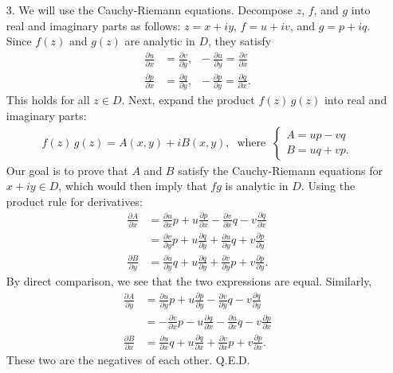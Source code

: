 \documentclass[10pt,a4paper]{article}
\begin{document}
\begin{enumerate}
\item[3.]
We will use the Cauchy-Riemann equations. Decompose $z$, $f$, and
$g$ into real and imaginary parts as follows: $z = x + i y$,
$f = u + i v$, and $g = p + i q$. Since $f(z)$ and $g(z)$ are
analytic in $D$, they satisfy
\begin{align}
  \frac{\partial u}{\partial x} &= \frac{\partial v}{\partial y},\;\; -\frac{\partial u}{\partial y} = \frac{\partial v}{\partial x}\\
  \frac{\partial p}{\partial x} &= \frac{\partial q}{\partial y},\;\; -\frac{\partial p}{\partial y} = \frac{\partial q}{\partial x}.
\end{align}
This holds for all $z \in D$. Next, expand the product $f(z)\,g(z)$
into real and imaginary parts:
\begin{align}
  f(z)\,g(z) = A(x,y) + i B(x,y),\;\;\mathrm{where}\;\;
  \begin{cases}A = up - v q \\ B = uq + vp. \end{cases}
\end{align}
Our goal is to prove that $A$ and $B$ satisfy the Cauchy-Riemann
equations for $x + i y \in D$, which would then imply that $fg$ is
analytic in $D$. Using the product rule for derivatives:
\begin{align}
  \frac{\partial A}{\partial x} &= \frac{\partial u}{\partial x} p + u \frac{\partial p}{\partial x} - \frac{\partial v}{\partial x} q - v \frac{\partial q}{\partial x} \\
  &= \frac{\partial v}{\partial y} p + u \frac{\partial q}{\partial y} + \frac{\partial u}{\partial y} q + v \frac{\partial p}{\partial y} \\ \frac{\partial B}{\partial y} &= \frac{\partial u}{\partial y} q + u \frac{\partial q}{\partial y} + \frac{\partial v}{\partial y} p + v \frac{\partial p}{\partial y}.
\end{align}
By direct comparison, we see that the two expressions are equal.
Similarly,
\begin{align}
  \frac{\partial A}{\partial y} &= \frac{\partial u}{\partial y} p + u \frac{\partial p}{\partial y} - \frac{\partial v}{\partial y} q - v \frac{\partial q}{\partial y} \\
  &= - \frac{\partial v}{\partial x} p - u \frac{\partial q}{\partial x} - \frac{\partial u}{\partial x} q - v \frac{\partial p}{\partial x} \\
  \frac{\partial B}{\partial x} &=
  \frac{\partial u}{\partial x} q + u \frac{\partial q}{\partial x} + \frac{\partial v}{\partial x} p + v \frac{\partial p}{\partial x}.
\end{align}
These two are the negatives of each other. Q.E.D.
\end{enumerate}
\end{document}
